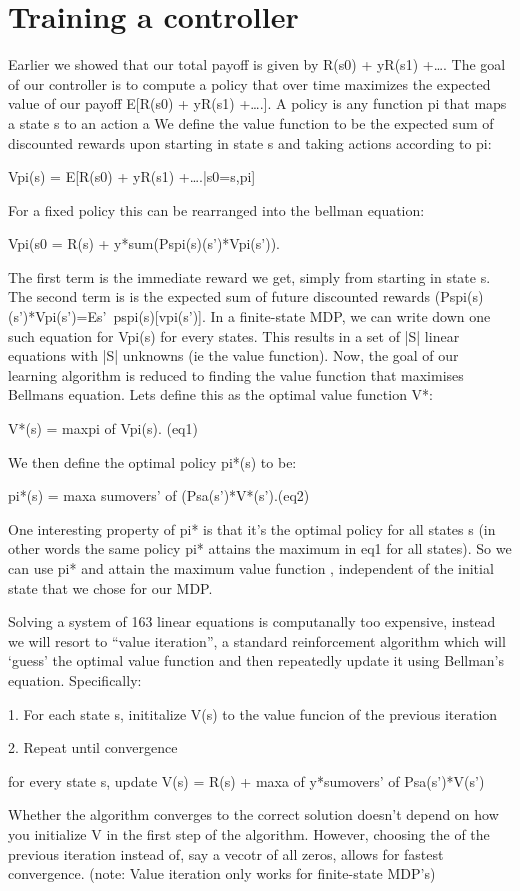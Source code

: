 \documentclass[final,3p,times,twocolumn]{elsarticle}
\begin{document}
\section{Training a controller}
Earlier we showed that our total payoff is given by R(s0) + yR(s1) +….
The goal of our controller is to compute a policy that over time maximizes the expected value of our payoff E[R(s0) + yR(s1) +….].
A policy is any function pi that maps a state s to an action a
We define the value function to be the expected sum of discounted rewards upon starting in state s and taking actions according to pi:\par
Vpi(s) = E[R(s0) + yR(s1) +….|s0=s,pi]\par
For a fixed policy this can be rearranged into the bellman equation:\par
Vpi(s0 = R(s) + y*sum(Pspi(s)(s’)*Vpi(s’)).\par
The first term is the immediate reward we get, simply from starting in state s. The second term is is the expected sum of future discounted rewards (Pspi(s)(s’)*Vpi(s’)=Es’~pspi(s)[vpi(s’)].
In a finite-state MDP, we can write down one such equation for Vpi(s) for every states. This results in a set of |S| linear equations with |S| unknowns (ie the value function).
Now, the goal of our learning algorithm is reduced to finding the value function that maximises Bellmans equation. Lets define this as the optimal value function V*:\par
V*(s) = maxpi of Vpi(s). (eq1)\par
We then define the optimal policy pi*(s) to be:\par
pi*(s) = maxa sumovers’ of (Psa(s’)*V*(s’).(eq2)\par
One interesting property of pi* is that it’s the optimal policy for all states s (in other words the same policy pi* attains the maximum in eq1 for all states). 
So we can use pi* and attain the maximum value function , independent of the initial state that we chose for our MDP.\par

Solving a system of 163 linear equations is computanally too expensive, instead we will resort to “value iteration”, a standard reinforcement algorithm which will ‘guess’ the optimal value function and then repeatedly update it using Bellman’s equation. Specifically:\par
1. For each state s, inititalize V(s) to the value funcion of the previous iteration\par
2. Repeat until convergence { \par
for every state s, update V(s) = R(s) + maxa of y*sumovers’ of Psa(s’)*V(s’)\par
} \par
Whether the algorithm converges to the correct solution doesn’t depend on how you initialize V in the first step of the algorithm. However, choosing the of the previous iteration instead of, say a vecotr of all zeros, allows for fastest convergence.
(note: Value iteration only works for finite-state MDP’s)
\end{document}
